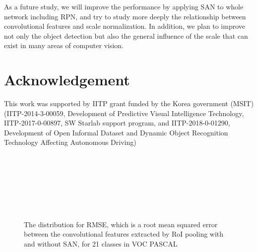 \documentclass[runningheads]{llncs}
\begin{document}
As a future study, we will improve the performance by applying SAN to whole network including RPN, and try to study more deeply the relationship between convolutional features and scale normalization.
In addition, we plan to improve not only the object detection but also the general influence of the scale that can exist in many areas of computer vision.


\section*{Acknowledgement}
This work was supported by IITP grant funded by the Korea government (MSIT)
(IITP-2014-3-00059, Development of Predictive Visual Intelligence Technology,
IITP-2017-0-00897, SW Starlab support program,
and
IITP-2018-0-01290, Development of Open Informal Dataset and Dynamic Object Recognition Technology Affecting Autonomous Driving)





\begin{figure}[pt]

	\\
	\\
	\\
	\\
	\\
	\\
	\caption{The distribution for RMSE, which is a root mean squared error between the convolutional features extracted by RoI pooling with and without SAN, for 21 classes in VOC PASCAL}
	\centering
	\label{fig:sandist}
\end{figure}
\end{document}
